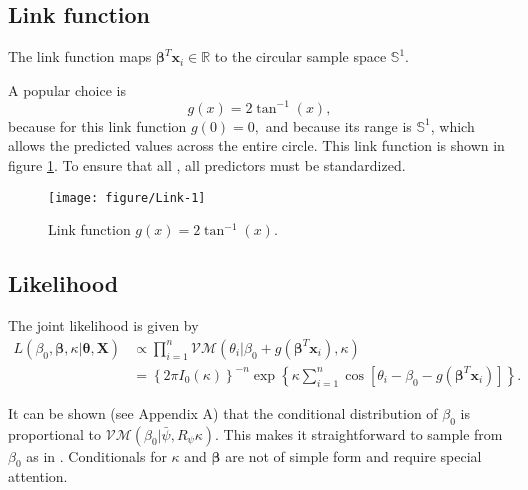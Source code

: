 \documentclass[12pt,a4paper]{article}\usepackage[]{graphicx}\usepackage[]{color}
\newenvironment{knitrout}{}{} %
\begin{document}
\subsection{Link function}

The link function maps $\boldsymbol\beta^T \boldsymbol{x}_i \in \mathbb{R}$ to the circular sample space $\mathbb{S}^1$.

A popular choice is
\begin{equation}
g(x) = 2 \tan^{-1}(x),
\end{equation} because for this link function $g(0) = 0,$ and because its range is $\mathbb{S}^1$, which allows the predicted values across the entire circle. This link function is shown in figure \ref{linkfunc}. To ensure that all , all predictors must be standardized. 

\begin{figure}
\begin{knitrout}
\color{fgcolor}

{\centering \texttt{[image: figure/Link-1]} 

}



\end{knitrout}
\caption{Link function $g(x) = 2 \tan^{-1}(x).$}
\label{linkfunc}
\end{figure}

\subsection{Likelihood}

The joint likelihood is given by
\begin{align}
L(\beta_0, \boldsymbol{\beta}, \kappa \vert \boldsymbol{\theta}, \boldsymbol{X}) &\propto  \prod_{i=1}^{n} \mathcal{VM}(\theta_i \vert \beta_0 + g(\boldsymbol\beta^T \boldsymbol{x}_i), \kappa) \\
&=  \left\lbrace 2 \pi I_0(\kappa) \right\rbrace^{-n} \exp \left\lbrace \kappa \sum_{i=1}^{n} \cos \left[ \theta_i - \beta_0 - g(\boldsymbol\beta^T \boldsymbol{x}_i) \right]  \right\rbrace.
\end{align}

It can be shown (see Appendix A) that the conditional distribution of $\beta_0$ is proportional to $\mathcal{VM}(\beta_0 \vert \bar\psi, R_{\psi} \kappa).$ This makes it straightforward to sample from $\beta_0$ as in \citet{fisher1995statistical}. Conditionals for $\kappa$ and $\boldsymbol\beta$ are not of simple form and require special attention.
\end{document}
